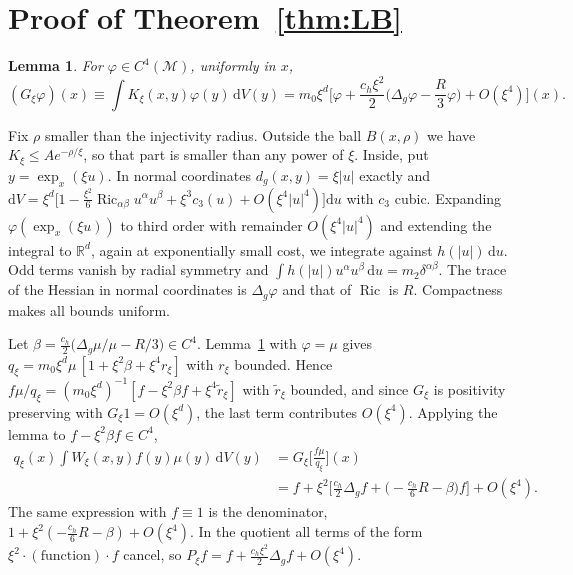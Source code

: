\documentclass[11pt,a4paper]{article}
\makeatletter
\theoremstyle{stmt}
\newtheorem{lemma}[theorem]{Lemma}
\theoremstyle{defn}
\theoremstyle{rmk}
\renewenvironment{proof}[1][\proofname]{\par\pushQED{\qed}\normalfont\topsep6\p@\@plus6\p@\relax
  \trivlist\item[\hskip\labelsep{\sffamily\itshape\small #1.}]\ignorespaces}{\popQED\endtrivlist\@endpefalse}
\numberwithin{equation}{section}
\DeclareMathOperator{\Ric}{Ric}
\newcommand{\M}{\mathcal{M}}
\newcommand{\R}{\mathbb{R}}
\newcommand{\dd}{\mathrm{d}}
\makeatother
\begin{document}
\appendix

\section{Proof of Theorem~\ref{thm:LB}}\label{app:LB}

\begin{lemma}\label{lem:G}
For $\varphi\in C^4(\M)$, uniformly in $x$,
\begin{equation}\label{eq:G}
(G_\xi\varphi)(x)\equiv\int K_\xi(x,y)\varphi(y)\,\dd V(y)=m_0\xi^d\Big[\varphi+\frac{c_h\xi^2}{2}\Big(\Delta_g\varphi-\frac R3\varphi\Big)+O(\xi^4)\Big](x).
\end{equation}
\end{lemma}

\begin{proof}
Fix $\rho$ smaller than the injectivity radius. Outside the ball $B(x,\rho)$ we have $K_\xi\le Ae^{-\rho/\xi}$, so that part is smaller than any power of $\xi$. Inside, put $y=\exp_x(\xi u)$. In normal coordinates $d_g(x,y)=\xi|u|$ exactly and $\dd V=\xi^d\big[1-\tfrac{\xi^2}{6}\Ric_{\alpha\beta}u^\alpha u^\beta+\xi^3c_3(u)+O(\xi^4|u|^4)\big]\dd u$ with $c_3$ cubic. Expanding $\varphi(\exp_x(\xi u))$ to third order with remainder $O(\xi^4|u|^4)$ and extending the integral to $\R^d$, again at exponentially small cost, we integrate against $h(|u|)\,\dd u$. Odd terms vanish by radial symmetry and $\int h(|u|)u^\alpha u^\beta\,\dd u=m_2\delta^{\alpha\beta}$. The trace of the Hessian in normal coordinates is $\Delta_g\varphi$ and that of $\Ric$ is $R$. Compactness makes all bounds uniform.
\end{proof}

\begin{proof}[Proof of Theorem~\ref{thm:LB}]
Let $\beta=\tfrac{c_h}{2}\big(\Delta_g\mu/\mu-R/3\big)\in C^4$. Lemma~\ref{lem:G} with $\varphi=\mu$ gives $q_\xi=m_0\xi^d\mu\,[1+\xi^2\beta+\xi^4r_\xi]$ with $r_\xi$ bounded. Hence $f\mu/q_\xi=(m_0\xi^d)^{-1}[f-\xi^2\beta f+\xi^4\tilde r_\xi]$ with $\tilde r_\xi$ bounded, and since $G_\xi$ is positivity preserving with $G_\xi1=O(\xi^d)$, the last term contributes $O(\xi^4)$. Applying the lemma to $f-\xi^2\beta f\in C^4$,
\begin{equation}
\begin{split}
q_\xi(x)\int W_\xi(x,y)f(y)\mu(y)\,\dd V(y)&=G_\xi\Big[\frac{f\mu}{q_\xi}\Big](x)\\
&=f+\xi^2\Big[\frac{c_h}{2}\Delta_gf+\Big(-\frac{c_h}{6}R-\beta\Big)f\Big]+O(\xi^4).
\end{split}
\end{equation}
The same expression with $f\equiv1$ is the denominator, $1+\xi^2(-\tfrac{c_h}{6}R-\beta)+O(\xi^4)$. In the quotient all terms of the form $\xi^2\cdot(\text{function})\cdot f$ cancel, so $P_\xi f=f+\tfrac{c_h\xi^2}{2}\Delta_gf+O(\xi^4)$.
\end{proof}
\end{document}
